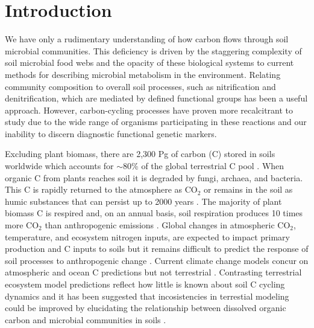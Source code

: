 \section{Introduction}
We have only a rudimentary understanding of how carbon flows through soil microbial communities. This deficiency is driven by the staggering complexity of soil microbial food webs and the opacity of these biological systems to current methods for describing microbial metabolism in the environment. Relating community composition to overall soil processes, such as nitrification and denitrification, which are mediated by defined functional groups has been a useful approach. However, carbon-cycling processes have proven more recalcitrant to study due to the wide range of organisms participating in these reactions and our inability to discern diagnostic functional genetic markers.
 
Excluding plant biomass, there are 2,300 Pg of carbon (C) stored in soils worldwide which accounts for $\sim$80\% of the global terrestrial C pool \cite{Amundson_2001,BATJES_1996}. When organic C from plants reaches soil it is degraded by fungi, archaea, and bacteria. This C is rapidly returned to the atmosphere as CO$_{2}$ or remains in the soil as humic substances that can persist up to 2000 years \cite{yanagita1990natural}. The majority of plant biomass C is respired and, on an annual basis, soil respiration produces 10 times more CO$_{2}$ than anthropogenic emissions \cite{chapin2002principles}. Global changes in atmospheric CO$_{2}$, temperature, and ecosystem nitrogen inputs, are expected to impact primary production and C inputs to soils \cite{Groenigen_2006} but it remains difficult to predict the response of soil processes to anthropogenic change \cite{DAVIDSON_2006}. Current climate change models concur on atmospheric and ocean C predictions but not terrestrial \cite{Friedlingstein_2006}. Contrasting terrestrial ecosystem model predictions reflect how little is known about soil C cycling dynamics and it has been suggested that incosistencies in terrestial modeling could be improved by elucidating the relationship between dissolved organic carbon and microbial communities in soils \cite{Neff_2001}. 


